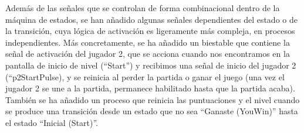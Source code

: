 Además de las señales que se controlan de forma combinacional dentro de la máquina de estados, se han añadido algunas señales dependientes del estado o de la transición, cuya lógica de activación es ligeramente más compleja, en procesos independientes. 
Más concretamente, se ha añadido un biestable que contiene la señal de activación del jugador 2, que se acciona cuando nos encontramos en la pantalla de inicio de nivel (``Start'') y recibimos una señal de inicio del jugador 2 (``p2StartPulse), y se reinicia al perder la partida o ganar el juego (una vez el jugador 2 se une a la partida, permanece habilitado hasta que la partida acaba). También se ha añadido un proceso que reinicia las puntuaciones y el nivel cuando se produce una transición desde un estado que no sea ``Ganaste (YouWin)'' hasta el estado ``Inicial (Start)''.